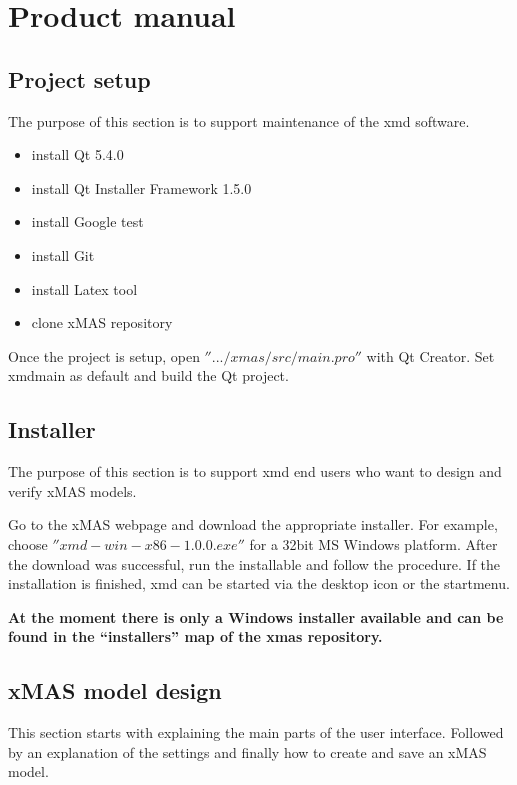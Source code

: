 \chapter{Product manual}

\section{Project setup}
The purpose of this section is to support maintenance of the xmd software.

\begin{itemize}
\item install Qt 5.4.0
\item install Qt Installer Framework 1.5.0
\item install Google test
\item install Git
\item install Latex tool
\item clone xMAS repository
\end{itemize}

Once the project is setup, open $''.../xmas/src/main.pro''$ with Qt Creator.
Set xmdmain as default and build the Qt project.

\section{Installer}
The purpose of this section is to support xmd end users who want to design and verify xMAS models.

Go to the xMAS webpage and download the appropriate installer. For example,
choose $''xmd-win-x86-1.0.0.exe''$ for a 32bit MS Windows platform. After
the download was successful, run the installable and follow the procedure.
If the installation is finished, xmd can be started via the desktop icon or the startmenu.

\begin{tcolorbox}[colback=white]
\textbf{
At the moment there is only a Windows installer available and can be found in
the ``installers'' map of the xmas repository.
}
\end{tcolorbox}

\section{xMAS model design}
This section starts with explaining the main parts of the user interface.
Followed by an explanation of the settings and finally how to create and save an
xMAS model.

